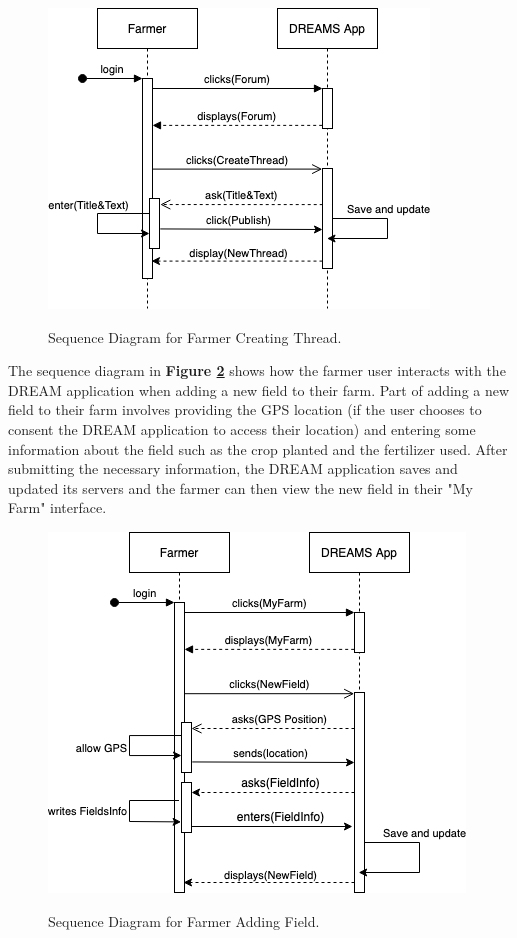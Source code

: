 \begin{figure}[hbt!]
\centering
\includegraphics[scale=0.6]{Files/sequence_disgrams/thePNGs/farmer_createThread.png}\\
\caption{\label{fig:farmerSeqNewThread}Sequence Diagram for Farmer Creating Thread.}
\end{figure}


\begin{flushleft}
The sequence diagram in \textbf{Figure \ref{fig:farmerSeqNewField}} shows how the farmer user interacts with the DREAM application when adding a new field to their farm. Part of adding a new field to their farm involves providing the GPS location (if the user chooses to consent the DREAM application to access their location) and entering some information about the field such as the crop planted and the fertilizer used. After submitting the necessary information, the DREAM application saves and updated its servers and the farmer can then view the new field in their "My Farm" interface.
\end{flushleft}

\begin{figure}[htb!]
\centering
\includegraphics[scale=0.6]{Files/sequence_disgrams/thePNGs/farmer_newField.png}\\
\caption{\label{fig:farmerSeqNewField}Sequence Diagram for Farmer Adding Field.}
\end{figure}

